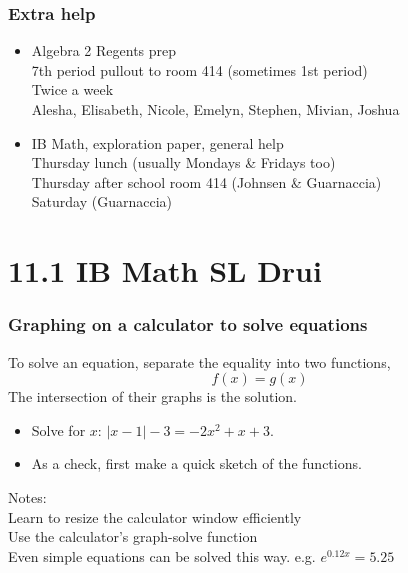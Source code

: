 \documentclass{beamer}
\begin{document}
\frame
{
  \frametitle{Extra help}
\begin{itemize}
      \item Algebra 2 Regents prep\\
      7th period pullout to room 414 (sometimes 1st period)\\
      Twice a week\\
      Alesha, Elisabeth, Nicole, Emelyn, Stephen, Mivian, Joshua\\[20pt]
      \item IB Math, exploration paper, general help\\
      Thursday lunch (usually Mondays \& Fridays too)\\
      Thursday after school room 414 (Johnsen \& Guarnaccia)\\
      Saturday (Guarnaccia)
\end{itemize}
 }

\section{11.1 IB Math SL Drui}
\frame
{
  \frametitle{Graphing on a calculator to solve equations}

\begin{block}{To solve an equation, separate the equality into two functions, \[f(x)=g(x)\]The intersection of their graphs is the solution.}
  \begin{itemize}
      \item Solve for $x$: $|x-1|-3 = -2x^2+x+3$.
      \item As a check, first make a quick sketch of the functions.
  \end{itemize}
  \end{block}
  Notes: \\Learn to resize the calculator window efficiently\\
  Use the calculator's graph-solve function\\
  Even simple equations can be solved this way. e.g. $e^{0.12x} = 5.25$
}
\end{document}

